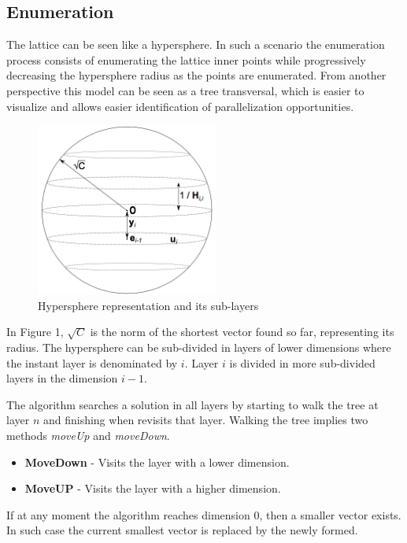 \documentclass[conference]{IEEEtran}
\begin{document}
\subsection{Enumeration}
    The lattice can be seen like a hypersphere. In such a scenario the enumeration process consists of enumerating the lattice inner points while progressively decreasing the hypersphere radius as the points are enumerated.
    From another perspective this model can be seen as a tree transversal, which is easier to visualize and allows easier identification of parallelization opportunities.

\begin{figure}[ht!]
\centering
\includegraphics[width=60mm]{imgSequential/hypersphere.png}
\caption{Hypersphere representation and its sub-layers}
\end{figure}

    In Figure 1, $\sqrt C$ is the norm of the shortest vector found so far, representing its radius. The hypersphere can be sub-divided in layers of lower dimensions where the instant layer is denominated by $i$. Layer $i$ is divided in more sub-divided layers in the dimension $i-1$. 
    
    The algorithm searches a solution in all layers by starting to walk the tree at layer $n$ and finishing when revisits that layer. Walking the tree implies two methods \emph{moveUp} and \emph{moveDown}.

\begin{itemize}
\item \textbf{MoveDown} - Visits the layer with a lower dimension.
\item \textbf{MoveUP} - Visits the layer with a higher dimension.
\end{itemize}

If at any moment the algorithm reaches dimension 0, then a smaller vector exists. In such case the current smallest vector is replaced by the newly formed.
\end{document}
